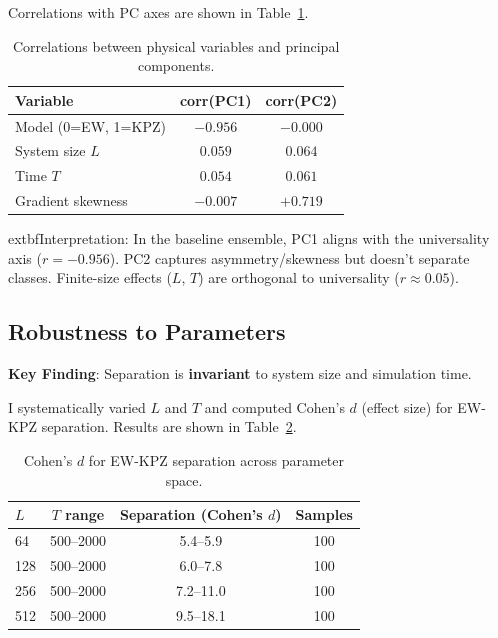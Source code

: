 \documentclass[aps,pre,twocolumn,superscriptaddress,showpacs]{revtex4-2}
\begin{document}
Correlations with PC axes are shown in Table~\ref{tab:corr}.

\begin{table}[h]
\caption{Correlations between physical variables and principal components.}
\label{tab:corr}
\begin{ruledtabular}
\begin{tabular}{lcc}
Variable & corr(PC1) & corr(PC2) \\
\hline
Model (0=EW, 1=KPZ) & $-0.956$ & $-0.000$ \\
System size $L$ & $0.059$ & $0.064$ \\
Time $T$ & $0.054$ & $0.061$ \\
Gradient skewness & $-0.007$ & $+0.719$ \\
\end{tabular}
\end{ruledtabular}
\end{table}

	extbf{Interpretation}: In the baseline ensemble, PC1 aligns with the universality axis ($r = -0.956$). PC2 captures asymmetry/skewness but doesn't separate classes. Finite-size effects ($L$, $T$) are orthogonal to universality ($r \approx 0.05$).

\subsection{Robustness to Parameters}
\label{sec:robust}

\textbf{Key Finding}: Separation is \textbf{invariant} to system size and simulation time.

I systematically varied $L$ and $T$ and computed Cohen's $d$ (effect size) for EW-KPZ separation. Results are shown in Table~\ref{tab:robust}.

\begin{table}[h]
\caption{Cohen's $d$ for EW-KPZ separation across parameter space.}
\label{tab:robust}
\begin{ruledtabular}
\begin{tabular}{lccc}
$L$ & $T$ range & Separation (Cohen's $d$) & Samples \\
\hline
64 & 500--2000 & 5.4--5.9 & 100 \\
128 & 500--2000 & 6.0--7.8 & 100 \\
256 & 500--2000 & 7.2--11.0 & 100 \\
512 & 500--2000 & 9.5--18.1 & 100 \\
\end{tabular}
\end{ruledtabular}
\end{table}
\end{document}
